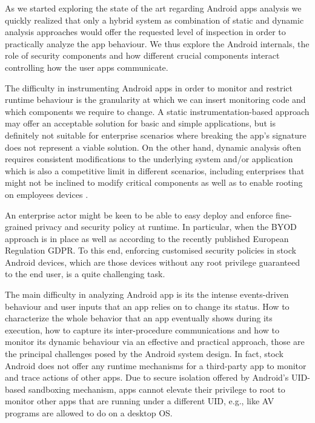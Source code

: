 As we started exploring the state of the art regarding Android apps  analysis we quickly realized that only a hybrid system as combination of static and dynamic analysis approaches would  offer the requested level of inspection in order to practically analyze the app behaviour.  We thus explore the Android internals, the role of security components and how different crucial components interact controlling how the user apps communicate.

The difficulty in instrumenting Android apps in order to monitor and restrict runtime behaviour is the granularity at which we can insert monitoring code and which components we require to change. A static instrumentation-based approach \cite{backes2013appguard, Apimonitor, xu2012aurasium, davis2012arm} may offer an acceptable solution for basic and simple applications, but is definitely not suitable for enterprise scenarios where breaking the app's signature does not represent a viable solution. On the other hand, dynamic analysis often requires consistent modifications to the underlying system and/or application \cite{enck2014taintdroid, rastogi2013appsplayground} which is also a competitive limit in different scenarios, including enterprises that might not be inclined to modify critical components as well as to enable rooting on employees devices \cite{russello2013firedroid,wang2015deepdroid}.

An enterprise actor might be keen to be able to easy deploy and enforce fine-grained privacy and security policy at runtime. In particular, when the BYOD approach is in place as well as according to the recently published European Regulation GDPR. To this end, enforcing customised security policies in stock Android devices, which are those devices without any root privilege guaranteed to the end user, is a quite challenging task. 

The main difficulty in analyzing Android app is its the intense events-driven behaviour and user inputs that an app relies on to change its status. How to characterize the whole behavior that an app eventually shows during its execution, how to capture its inter-procedure communications and how to monitor its dynamic behaviour via an effective and practical approach, those are the principal challenges posed by the Android system design. In fact, stock Android does not offer any runtime mechanisms for a third-party app to monitor and trace actions of other apps. Due to secure isolation offered by Android’s UID-based sandboxing mechanism, apps cannot elevate their privilege to root to monitor other apps that are running under a different UID, e.g., like AV programs are allowed to do on a desktop OS. 

